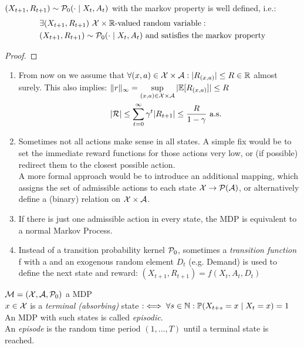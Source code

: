 \begin{remark}
\((X_{t+1}, R_{t+1})\sim\mathcal{P}_0(\cdot\mid X_t, A_t)\) with the markov property is well defined, i.e.:
\begin{align*}
	&\exists (X_{t+1}, R_{t+1})\ \mathcal{X}\times\mathbb{R}\text{-valued random variable}: \\ 
	&(X_{t+1}, R_{t+1})\sim\mathcal{P}_0(\cdot\mid X_t, A_t) \text{ and satisfies the markov property}
\end{align*}
\end{remark}
\begin{proof}
\end{proof}
\begin{remark}\leavevmode
\begin{enumerate}
	\item From now on we assume that \(\forall (x,a)\in\mathcal{X}\times\mathcal{A}:|R_{(x,a)}|\le R\in\mathbb{R}\) almost surely. This also implies: 			\(
	\begin{aligned}[t]
		&\|r\|_{\infty}=\sup_{(x,a)\in\mathcal{X}\times\mathcal{A}}|\mathbb{E}[R_{(x,a)}]|\le R\\
		&|\mathcal{R}|\le\sum_{t=0}^\infty \gamma^t |R_{t+1}|\le \frac{R}{1-\gamma} \text{ a.s.}
	\end{aligned}
	\)
	\item Sometimes not all actions make sense in all states. A simple fix would be to set the immediate reward functions for those actions very low, or (if possible) redirect them to the closest possible action. \\
	A more formal approach would be to introduce an additional mapping, which assigns the set of admissible actions to each state \(\mathcal{X}\to\mathcal{P}(\mathcal{A})\), or alternatively define a (binary) relation on \(\mathcal{X}\times\mathcal{A}\).
	\item If there is just one admissible action in every state, the MDP is equivalent to a normal Markov Process.
	\item Instead of a transition probability kernel \(\mathcal{P}_0\), sometimes a \emph{transition function} f with a and an exogenous random element \(D_t\) (e.g. Demand) is used to define the next state and reward: \((X_{t+1},R_{t+1})=f(X_t,A_t,D_t)\) 
\end{enumerate}
\end{remark}
\begin{definition}\(\mathcal{M}=(\mathcal{X},\mathcal{A},\mathcal{P}_0)\) a MDP\\
	\(x\in\mathcal{X}\) is a \emph{terminal (absorbing)} state \(:\iff \forall s\in\mathbb{N}: \mathbb{P}(X_{t+s}=x\mid X_t=x)=1\)\\
	An MDP with such states is called \emph{episodic}.\\
	An \emph{episode} is the random time period \((1,\dots,T)\) until a terminal state is reached.
\end{definition}
